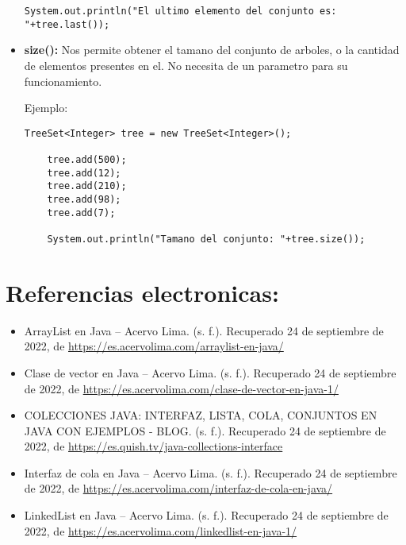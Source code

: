 \documentclass[12pt, letterpaper]{article} %
\begin{document}
\begin{itemize}
\begin{lstlisting}[frame=single]
    System.out.println("El ultimo elemento del conjunto es: "+tree.last());
    \end{lstlisting}

    \item \textbf{size():} Nos permite obtener el tamano del conjunto de arboles, o la cantidad de elementos presentes en el. No necesita de un parametro para su funcionamiento.

    Ejemplo:
    \lstset{language = Java, breaklines=true, basicstyle=\footnotesize}
    \begin{lstlisting}[frame=single]
    TreeSet<Integer> tree = new TreeSet<Integer>();

    tree.add(500);
    tree.add(12);
    tree.add(210);
    tree.add(98);
    tree.add(7);

    System.out.println("Tamano del conjunto: "+tree.size());
    \end{lstlisting}
\end{itemize}

\section*{Referencias electronicas:}
\begin{itemize}
    \item ArrayList en Java – Acervo Lima. (s. f.). Recuperado 24 de septiembre de 2022, de \href{https://bit.ly/3fB4HAN}{https://es.acervolima.com/arraylist-en-java/}
    
    \item Clase de vector en Java – Acervo Lima. (s. f.). Recuperado 24 de septiembre de 2022, de \href{https://es.acervolima.com/clase-de-vector-en-java-1/}{https://es.acervolima.com/clase-de-vector-en-java-1/}
    
    \item COLECCIONES JAVA: INTERFAZ, LISTA, COLA, CONJUNTOS EN JAVA CON EJEMPLOS - BLOG. (s. f.). Recuperado 24 de septiembre de 2022, de \href{https://es.quish.tv/java-collections-interface}{https://es.quish.tv/java-collections-interface}
    
    \item Interfaz de cola en Java – Acervo Lima. (s. f.). Recuperado 24 de septiembre de 2022, de \href{https://es.acervolima.com/interfaz-de-cola-en-java/}{https://es.acervolima.com/interfaz-de-cola-en-java/}
    
    \item LinkedList en Java – Acervo Lima. (s. f.). Recuperado 24 de septiembre de 2022, de \href{https://es.acervolima.com/linkedlist-en-java-1/}{https://es.acervolima.com/linkedlist-en-java-1/}
\end{itemize}
\end{document}
